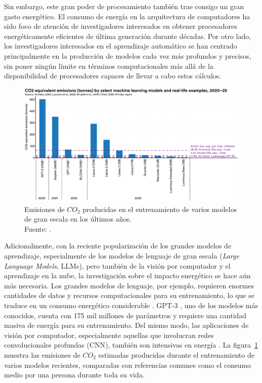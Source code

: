 Sin embargo, este gran poder de procesamiento también trae consigo un gran gasto energético.
El consumo de energía en la arquitectura de computadores ha sido foco de atención de investigadores interesados en obtener procesadores energéticamente eficientes de última generación durante décadas. 
Por otro lado, los investigadores interesados en el aprendizaje automático se han centrado principalmente en la producción de modelos cada vez más profundos y precisos, sin poner ningún límite en términos computacionales más allá de la disponibilidad de procesadores capaces de llevar a cabo estos cálculos.

\begin{figure}[H]
  \centering
  \includegraphics[width=\textwidth,keepaspectratio]{img/fig_2.13.1-ai-index.pdf}
  \caption{Emisiones de $CO_2$ producidas en el entrenamiento de varios modelos de gran escala en los últimos años. \\ Fuente:  \cite{maslej2024aiindex}.}
  \label{fig:ai-index-emissions}
\end{figure}

Adicionalmente, con la reciente popularización de los grandes modelos de aprendizaje, especialmente de los modelos de lenguaje de gran escala (\textit{Large Language Models}, LLMs), pero también de la visión por computador y el aprendizaje en la nube, la investigación sobre el impacto energético se hace aún más necesaria. Los grandes modelos de lenguaje, por ejemplo, requieren enormes cantidades de datos y recursos computacionales para su entrenamiento, lo que se traduce en un consumo energético considerable \cite{samsi2023}. \mbox{GPT-3} \cite{brown2020language}, uno de los modelos más conocidos, cuenta con 175 mil millones de parámetros y requiere una cantidad masiva de energía para su entrenamiento. Del mismo modo, las aplicaciones de visión por computador, especialmente aquellas que involucran redes convolucionales profundas (CNN), también son intensivas en energía \cite{alyamkin2019low}. La figura~\ref{fig:ai-index-emissions} muestra las emisiones de $CO_2$ estimadas producidas durante el entrenamiento de varios modelos recientes, comparadas con referencias comunes como el consumo medio por una persona durante toda su vida.

